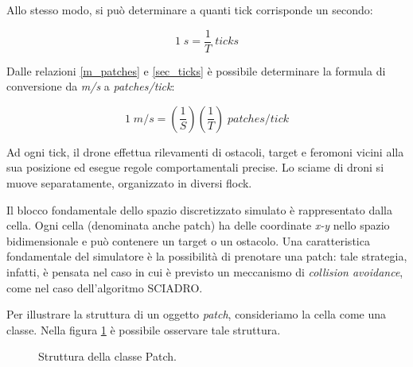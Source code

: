 Allo stesso modo, si può determinare a quanti tick corrisponde un secondo:

\begin{equation}
    \label{sec_ticks}
    1 \; s = \frac{1}{T} \; ticks
\end{equation}

Dalle relazioni \ref{m_patches} e \ref{sec_ticks} è possibile determinare la formula di conversione da \textit{m/s} a \textit{patches/tick}:

\begin{equation*}
    1 \; m/s = (\frac{1}{S})(\frac{1}{T}) \; patches/tick 
\end{equation*}

Ad ogni tick, il drone effettua rilevamenti di ostacoli, target e feromoni vicini alla sua posizione ed esegue regole comportamentali precise.
Lo sciame di droni si muove separatamente, organizzato in diversi flock.

Il blocco fondamentale dello spazio discretizzato simulato è rappresentato dalla cella.
Ogni cella (denominata anche patch) ha delle coordinate \textit{x-y} nello spazio bidimensionale e può contenere un target o un ostacolo.
Una caratteristica fondamentale del simulatore è la possibilità di prenotare una patch: tale strategia, infatti, è pensata nel caso in cui è previsto un meccanismo di \textit{collision avoidance}, come nel caso dell'algoritmo SCIADRO.

Per illustrare la struttura di un oggetto \textit{patch}, consideriamo la cella come una classe.
Nella figura \ref{classe_patch} è possibile osservare tale struttura.

\begin{figure}[H] 
    \captionsetup{justification=centering, margin=2cm, font=footnotesize}
    \begin{center}
    \end{center}
    \caption{Struttura della classe Patch.}
    \label{classe_patch}
\end{figure}

